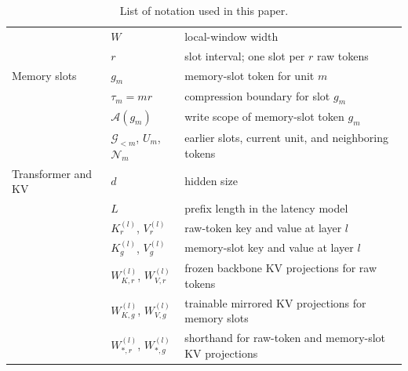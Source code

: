 \begin{table}[h]
{\begin{tabular}{@{}lll@{}}
                     & $W$ & local-window width \\
                     & $r$ & slot interval; one slot per $r$ raw tokens \\
        \midrule
        Memory slots & $g_m$ & memory-slot token for unit $m$ \\
                     & $\tau_m=mr$ & compression boundary for slot $g_m$ \\
                     & $\mathcal{A}(g_m)$ & write scope of memory-slot token $g_m$ \\
                     & $\mathcal{G}_{<m}$, $U_m$, $\mathcal{N}_m$ & earlier slots, current unit, and neighboring tokens \\
        \midrule
        Transformer and KV & $d$ & hidden size \\
                           & $L$ & prefix length in the latency model \\
                           & $K_r^{(l)}$, $V_r^{(l)}$ & raw-token key and value at layer $l$ \\
                           & $K_g^{(l)}$, $V_g^{(l)}$ & memory-slot key and value at layer $l$ \\
                           & $W_{K,r}^{(l)}$, $W_{V,r}^{(l)}$ & frozen backbone KV projections for raw tokens \\
                           & $W_{K,g}^{(l)}$, $W_{V,g}^{(l)}$ & trainable mirrored KV projections for memory slots \\
                           & $W_{\ast,r}^{(l)}$, $W_{\ast,g}^{(l)}$ & shorthand for raw-token and memory-slot KV projections \\
        \bottomrule
    \end{tabular}
    }
    \caption{List of notation used in this paper.}
    \label{tab:notation}
\end{table}
